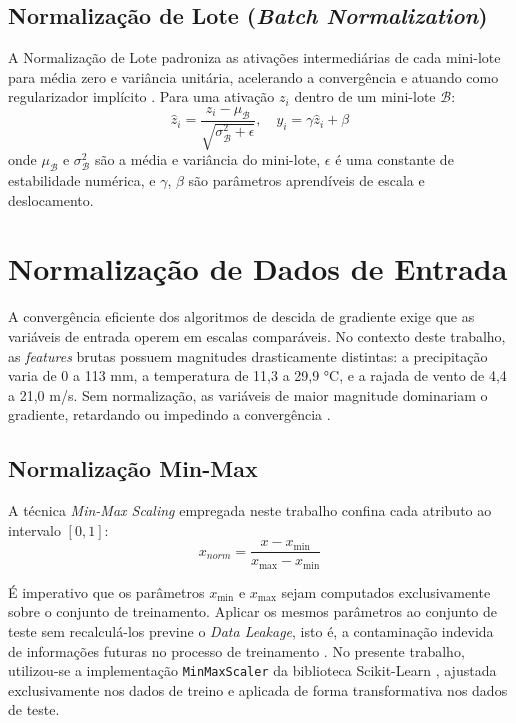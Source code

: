 \subsection{Normalização de Lote (\textit{Batch Normalization})}
A Normalização de Lote padroniza as ativações intermediárias de cada mini-lote para média zero e variância unitária, acelerando a convergência e atuando como regularizador implícito \cite{goodfellow2016deep}. Para uma ativação $z_i$ dentro de um mini-lote $\mathcal{B}$:
\begin{equation}
    \hat{z}_i = \frac{z_i - \mu_\mathcal{B}}{\sqrt{\sigma^2_\mathcal{B} + \epsilon}}, \quad y_i = \gamma \hat{z}_i + \beta
\end{equation}
onde $\mu_\mathcal{B}$ e $\sigma^2_\mathcal{B}$ são a média e variância do mini-lote, $\epsilon$ é uma constante de estabilidade numérica, e $\gamma$, $\beta$ são parâmetros aprendíveis de escala e deslocamento.

\section{Normalização de Dados de Entrada}\label{sec:normalizacao}

A convergência eficiente dos algoritmos de descida de gradiente exige que as variáveis de entrada operem em escalas comparáveis. No contexto deste trabalho, as \textit{features} brutas possuem magnitudes drasticamente distintas: a precipitação varia de 0 a 113 mm, a temperatura de 11,3 a 29,9 °C, e a rajada de vento de 4,4 a 21,0 m/s. Sem normalização, as variáveis de maior magnitude dominariam o gradiente, retardando ou impedindo a convergência \cite{bishop2006pattern}.

\subsection{Normalização Min-Max}
A técnica \textit{Min-Max Scaling} empregada neste trabalho confina cada atributo ao intervalo $[0, 1]$:
\begin{equation}
    x_{norm} = \frac{x - x_{\min}}{x_{\max} - x_{\min}}
    \label{eq:minmax}
\end{equation}

É imperativo que os parâmetros $x_{\min}$ e $x_{\max}$ sejam computados exclusivamente sobre o conjunto de treinamento. Aplicar os mesmos parâmetros ao conjunto de teste sem recalculá-los previne o \textit{Data Leakage}, isto é, a contaminação indevida de informações futuras no processo de treinamento \cite{hastie2009elements}. No presente trabalho, utilizou-se a implementação \texttt{MinMaxScaler} da biblioteca Scikit-Learn \cite{pedregosa2011scikit}, ajustada exclusivamente nos dados de treino e aplicada de forma transformativa nos dados de teste.


